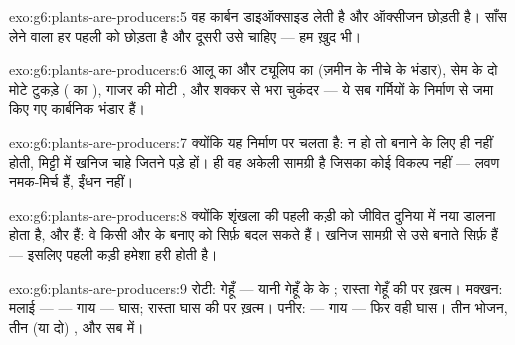 \begin{solution}{exo:g6:plants-are-producers:5}
वह कार्बन डाइऑक्साइड लेती है और ऑक्सीजन छोड़ती है। साँस लेने वाला हर
 पहली को छोड़ता है और दूसरी उसे चाहिए --- हम ख़ुद भी।
\end{solution}

\begin{solution}{exo:g6:plants-are-producers:6}
आलू का  और ट्यूलिप का  (ज़मीन के नीचे के भंडार), सेम के दो
मोटे टुकड़े ( का ), गाजर की मोटी , और शक्कर से भरा
चुकंदर --- ये सब गर्मियों के निर्माण से जमा किए गए कार्बनिक भंडार हैं।
\end{solution}

\begin{solution}{exo:g6:plants-are-producers:7}
क्योंकि यह निर्माण  पर चलता है:  न हो तो 
बनाने के लिए  ही नहीं होती, मिट्टी में खनिज चाहे जितने पड़े हों।
 ही वह अकेली सामग्री है जिसका कोई विकल्प नहीं --- लवण नमक-मिर्च
हैं, ईंधन नहीं।
\end{solution}

\begin{solution}{exo:g6:plants-are-producers:8}
क्योंकि शृंखला की पहली कड़ी को जीवित दुनिया में नया 
डालना होता है, और   हैं: वे किसी और के बनाए 
को सिर्फ़ बदल सकते हैं। खनिज सामग्री से उसे बनाते सिर्फ़  हैं ---
इसलिए पहली कड़ी हमेशा हरी होती है।
\end{solution}

\begin{solution}{exo:g6:plants-are-producers:9}
रोटी: गेहूँ --- यानी गेहूँ के  के ; रास्ता गेहूँ की  पर
ख़त्म। मक्खन: मलाई ---  --- गाय --- घास; रास्ता घास की  पर
ख़त्म। पनीर:  --- गाय --- फिर वही घास। तीन भोजन, तीन (या दो)
, और सब  में।
\end{solution}


